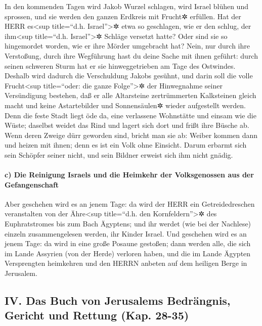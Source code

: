 In den kommenden Tagen wird Jakob Wurzel schlagen, wird
Israel blühen und sprossen, und sie werden den ganzen Erdkreis mit
Frucht✲ erfüllen. Hat der HERR es\textless sup
title=``d.h. Israel''\textgreater✲ etwa so geschlagen, wie er den
schlug, der ihm\textless sup title=``d.h. Israel''\textgreater✲ Schläge
versetzt hatte? Oder sind sie so hingemordet worden, wie er ihre Mörder
umgebracht hat? Nein, nur durch ihre Verstoßung, durch
ihre Wegführung hast du deine Sache mit ihnen geführt: durch seinen
schweren Sturm hat er sie hinweggetrieben am Tage des Ostwindes.
Deshalb wird dadurch die Verschuldung Jakobs gesühnt, und
darin soll die volle Frucht\textless sup title=``oder: die ganze
Folge''\textgreater✲ der Hinwegnahme seiner Versündigung bestehen, daß
er alle Altarsteine zertrümmerten Kalksteinen gleich macht und keine
Astartebilder und Sonnensäulen✲ wieder aufgestellt werden.
Denn die feste Stadt liegt öde da, eine verlassene
Wohnstätte und einsam wie die Wüste; daselbst weidet das Rind und lagert
sich dort und frißt ihre Büsche ab. Wenn deren Zweige
dürr geworden sind, bricht man sie ab: Weiber kommen dann und heizen mit
ihnen; denn es ist ein Volk ohne Einsicht. Darum erbarmt sich sein
Schöpfer seiner nicht, und sein Bildner erweist sich ihm nicht gnädig.

\hypertarget{c-die-reinigung-israels-und-die-heimkehr-der-volksgenossen-aus-der-gefangenschaft}{%
\paragraph{c) Die Reinigung Israels und die Heimkehr der Volksgenossen
aus der
Gefangenschaft}\label{c-die-reinigung-israels-und-die-heimkehr-der-volksgenossen-aus-der-gefangenschaft}}

Aber geschehen wird es an jenem Tage: da wird der HERR
ein Getreidedreschen veranstalten von der Ähre\textless sup title=``d.h.
den Kornfeldern''\textgreater✲ des Euphratstromes bis zum Bach Ägyptens;
und ihr werdet (wie bei der Nachlese) einzeln zusammengelesen werden,
ihr Kinder Israel. Und geschehen wird es an jenem Tage:
da wird in eine große Posaune gestoßen; dann werden alle, die sich im
Lande Assyrien (von der Herde) verloren haben, und die im Lande Ägypten
Versprengten heimkehren und den HERRN anbeten auf dem heiligen Berge in
Jerusalem.

\hypertarget{iv.-das-buch-von-jerusalems-bedruxe4ngnis-gericht-und-rettung-kap.-28-35}{%
\subsection{IV. Das Buch von Jerusalems Bedrängnis, Gericht und Rettung
(Kap.
28-35)}\label{iv.-das-buch-von-jerusalems-bedruxe4ngnis-gericht-und-rettung-kap.-28-35}}

